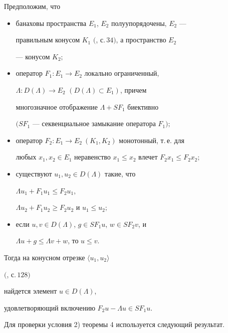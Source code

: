 \begin{thm}[{\myfont{}[2]}] Предположим, что 


\begin{itemize} 


\item[1)] банаховы пространства $E_1$, $E_2$ полуупорядочены, $E_2$ --- 


правильным конусом $K_1$ $($\cite{19}, с.\,$34)$, а пространство $E_2$ 


--- конусом $K_2;$ 


\item[2)] оператор $F_1:E_1\to E_2$ локально ограниченный, 


$\Lambda:D(\Lambda)\to E_2$ $(D(\Lambda)\subset E_1)$, причем 


многозначное отображение $\Lambda+SF_1$ биективно 


$(SF_1$ --- секвенциальное замыкание оператора $F_1);$ 


\item[3)] оператор $F_2:E_1\to E_2\ (K_1,K_2)$ монотонный, т.\,е. для 


любых $x_1,x_2\in E_1$ неравенство $x_1\le x_2$ влечет $F_2x_1\le 


F_2x_2;$ 


\item[4)] существуют $u_1,u_2\in D(\Lambda)$ такие, что 


$\Lambda u_1+F_1u_1\le F_2u_1$, 


$\Lambda u_2+F_1u_2\ge F_2u_2$ и $u_1\le u_2;$ 


\item[5)] если $u,v\in D(\Lambda)$, $g\in SF_1u$, $w\in SF_2v$, и 


$\Lambda u+g\le\Lambda v+w$, то $u\le v$.


\end{itemize} 


Тогда на конусном отрезке $\langle u_1,u_2\rangle$ 


$($\cite{19}, с.\,$128)$ 


найдется элемент $u\in D(\Lambda)$, 


удовлетворяющий включению $F_2u-\Lambda u\in SF_1u$. 


\end{thm} 


 


Для проверки условия 2) теоремы 4 используется следующий результат. 


